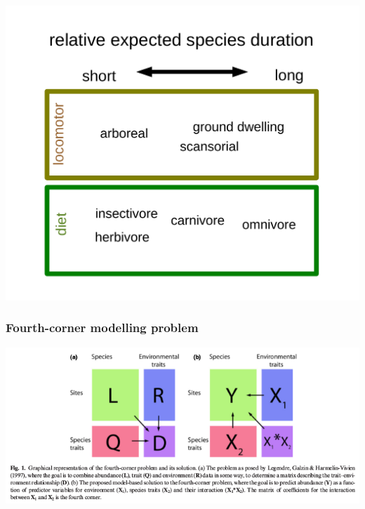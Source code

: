 \documentclass{beamer}
\begin{document}
\begin{frame}
  \begin{center}
    \includegraphics[height=0.8\textheight,width=\textwidth,keepaspectratio=true]{figure/smits_2015_results}
  \end{center}

  \tiny{}
\end{frame}

\begin{frame}
  \frametitle{Fourth-corner modelling problem}
  \begin{center}
    \includegraphics[height=0.8\textheight,width=\textwidth,keepaspectratio=true]{figure/brown_fourth_corner}
  \end{center}

  \tiny{}
\end{frame}
\end{document}
